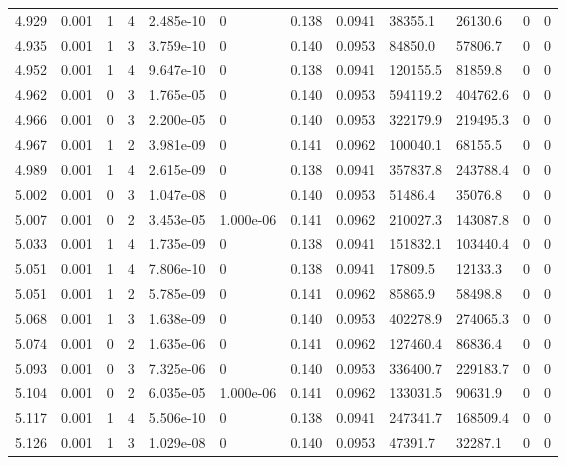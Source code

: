 \documentclass[preview]{standalone}
\begin{document}
{{{{{{{\begin{tabular}{L{1.2cm}C{1.2cm} C{0.3cm}C{0.5cm} C{1.4cm}C{1.4cm} C{1.4cm}C{1.4cm} C{1.6cm}C{1.6cm} C{1.6cm}C{1.6cm}}
  4.929  &  0.001  & 1     &  4 &  2.485e-10  & 0  &  0.138&   0.0941& 38355.1 & 26130.6   &  0 & 0  \\ 
  4.935  &  0.001  & 1     &  3 &  3.759e-10  & 0  &  0.140&   0.0953& 84850.0 & 57806.7   &  0 & 0  \\ 
  4.952  &  0.001  & 1     &  4 &  9.647e-10  & 0  &  0.138&   0.0941& 120155.5 & 81859.8   &  0 & 0  \\ 
  4.962  &  0.001  & 0     &  3 &  1.765e-05  & 0  &  0.140&   0.0953& 594119.2 & 404762.6   &  0 & 0  \\ 
  4.966  &  0.001  & 0     &  3 &  2.200e-05  & 0  &  0.140&   0.0953& 322179.9 & 219495.3   &  0 & 0  \\ 
  4.967  &  0.001  & 1     &  2 &  3.981e-09  & 0  &  0.141&   0.0962& 100040.1 & 68155.5   &  0 & 0  \\ 
  4.989  &  0.001  & 1     &  4 &  2.615e-09  & 0  &  0.138&   0.0941& 357837.8 & 243788.4   &  0 & 0  \\ 
  5.002  &  0.001  & 0     &  3 &  1.047e-08  & 0  &  0.140&   0.0953& 51486.4 & 35076.8   &  0 & 0  \\ 
  5.007  &  0.001  & 0     &  2 &  3.453e-05  & 1.000e-06  &  0.141&   0.0962& 210027.3 & 143087.8   &  0 & 0  \\ 
  5.033  &  0.001  & 1     &  4 &  1.735e-09  & 0  &  0.138&   0.0941& 151832.1 & 103440.4   &  0 & 0  \\ 
  5.051  &  0.001  & 1     &  4 &  7.806e-10  & 0  &  0.138&   0.0941& 17809.5 & 12133.3   &  0 & 0  \\ 
  5.051  &  0.001  & 1     &  2 &  5.785e-09  & 0  &  0.141&   0.0962& 85865.9 & 58498.8   &  0 & 0  \\ 
  5.068  &  0.001  & 1     &  3 &  1.638e-09  & 0  &  0.140&   0.0953& 402278.9 & 274065.3   &  0 & 0  \\ 
  5.074  &  0.001  & 0     &  2 &  1.635e-06  & 0  &  0.141&   0.0962& 127460.4 & 86836.4   &  0 & 0  \\ 
  5.093  &  0.001  & 0     &  3 &  7.325e-06  & 0  &  0.140&   0.0953& 336400.7 & 229183.7   &  0 & 0  \\ 
  5.104  &  0.001  & 0     &  2 &  6.035e-05  & 1.000e-06  &  0.141&   0.0962& 133031.5 & 90631.9   &  0 & 0  \\ 
  5.117  &  0.001  & 1     &  4 &  5.506e-10  & 0  &  0.138&   0.0941& 247341.7 & 168509.4   &  0 & 0  \\ 
  5.126  &  0.001  & 1     &  3 &  1.029e-08  & 0  &  0.140&   0.0953& 47391.7 & 32287.1   &  0 & 0  \\ 

\end{tabular}}}}}}}}
\end{document}

